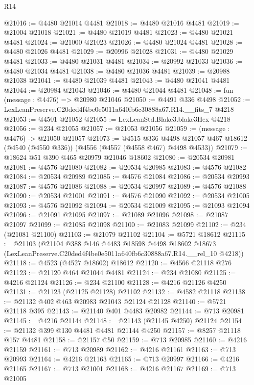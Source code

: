 \begin{lexlean}{R14}
\begin{coremodule}
@21016 := @4480 @21014 @4481
@21018 := @4480 @21016 @4481
@21019 := @21004 @21018
@21021 := @4480 @21019 @4481
@21023 := @4480 @21021 @4481
@21024 := @21000 @21023
@21026 := @4480 @21024 @4481
@21028 := @4480 @21026 @4481
@21029 := @20996 @21028
@21031 := @4480 @21029 @4481
@21033 := @4480 @21031 @4481
@21034 := @20992 @21033
@21036 := @4480 @21034 @4481
@21038 := @4480 @21036 @4481
@21039 := @20988 @21038
@21041 := @4480 @21039 @4481
@21043 := @4480 @21041 @4481
@21044 := @20984 @21043
@21046 := @4480 @21044 @4481
@21048 := fun (message : @4476) => @20980 @21046
@21050 := @4491 @336 @4498
@21052 := LexLeanPreserve.C20ded4f4be0e5011a640fb6c30888a67.R14.__fits_7 @4218
@21053 := @4501 @21052
@21055 := LexLeanStd.Blake3.blake3Hex @4218
@21056 := @234 @21055
@21057 := @21053 @21056
@21059 := (message : @4476) -> @21050 @21057
@21073 := @4515
    @336
    @4498
    @21057
    @467
    @18612
    (@4540 (@4550 @336))
    (@4556 (@4557 (@4558 @467) @4498 @4533))
@21079 := @18624 @51 @390 @465 @20979 @21046 @18602
@21080 := @20534 @20981
@21081 := @4576 @21080
@21082 := @20534 @20985
@21083 := @4576 @21082
@21084 := @20534 @20989
@21085 := @4576 @21084
@21086 := @20534 @20993
@21087 := @4576 @21086
@21088 := @20534 @20997
@21089 := @4576 @21088
@21090 := @20534 @21001
@21091 := @4576 @21090
@21092 := @20534 @21005
@21093 := @4576 @21092
@21094 := @20534 @21009
@21095 := @21093 @21094
@21096 := @21091 @21095
@21097 := @21089 @21096
@21098 := @21087 @21097
@21099 := @21085 @21098
@21100 := @21083 @21099
@21102 := @234 (@21081 @21100)
@21103 := @21079 @21102
@21104 := @5721 @18612
@21115 := @21103
    (@21104
      @388
      @146
      @4483
      @18598
      @4498
      @18602
      @18673
      (LexLeanPreserve.C20ded4f4be0e5011a640fb6c30888a67.R14.__rel_10 @4218))
@21118 := @4523 (@4527 @18602) @18612
@21120 := @4566 @21118 @276
@21123 := @21120 @464 @21044 @4481
@21124 := @234 @21080
@21125 := @4216 @21124
@21126 := @234 @21100
@21128 := @4216 @21126 @4250
@21131 := @21123 (@21125 @21128) @21102
@21132 := @4582 @21118
@21138 := @21132 @402 @463 @20983 @21043 @21124 @21128
@21140 := @5721 @21118 @395
@21143 := @21140 @401 @4483 @20982
@21144 := @713 @20981
@21145 := @4216 @21144
@21148 := @21143 (@21145 @4250) @21124
@21154 := @21132 @399 @130 @4481 @4481 @21144 @4250
@21157 := @8257 @21118 @157 @4481
@21158 := @21157 @50
@21159 := @713 @20985
@21160 := @4216 @21159
@21161 := @713 @20989
@21162 := @4216 @21161
@21163 := @713 @20993
@21164 := @4216 @21163
@21165 := @713 @20997
@21166 := @4216 @21165
@21167 := @713 @21001
@21168 := @4216 @21167
@21169 := @713 @21005

\end{coremodule}
\end{lexlean}
